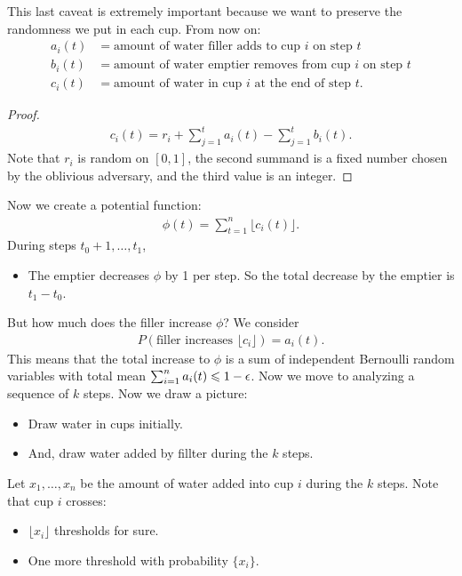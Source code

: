 \documentclass{report}
\begin{document}
This last caveat is extremely important because we want to preserve the randomness we put in each cup. From now on:
\begin{align*}
    a_i(t) &= \text{amount of water filler adds to cup $i$ on step $t$} \\
    b_i(t) &= \text{amount of water emptier removes from cup $i$ on step $t$} \\
    c_i(t) &= \text{amount of water in cup $i$ at the end of step $t$}.
\end{align*}
\begin{proof}
    \begin{align*}
        c_i(t) = r_i + \sum_{j=1}^t a_i(t) - \sum_{j=1}^t b_i(t).
    \end{align*}
    Note that $r_i$ is random on $[0,1]$, the second summand is a fixed number chosen by the oblivious adversary, and the third value is an integer.
\end{proof}
\noindent Now we create a potential function:
\begin{align*}
    \phi(t) = \sum_{t=1}^n \lfloor c_i(t) \rfloor.
\end{align*}
\noindent During steps $t_0+1, \ldots, t_1$, 
\begin{itemize}
    \item The emptier decreases $\phi$ by 1 per step. So the total decrease by the emptier is $t_1 - t_0$.
\end{itemize}
But how much does the filler increase $\phi$? We consider 
\begin{align*}
    P(\text{filler increases $\lfloor c_i\rfloor$}) = a_i(t).
\end{align*}
This means that the total increase to $\phi$ is a sum of independent Bernoulli random variables with total mean $\sum_{i=1}^n a_i(t) \leqslant 1 -\epsilon$. Now we move to analyzing a sequence of $k$ steps. Now we draw a picture:
\begin{itemize}
    \item Draw water in cups initially.
    \item And, draw water added by fillter during the $k$ steps.
\end{itemize}
Let $x_1, \ldots, x_n$ be the amount of water added into cup $i$ during the $k$ steps. Note that cup $i$ crosses:
\begin{itemize}
    \item $\lfloor x_i\rfloor$ thresholds for sure.
    \item One more threshold with probability $\{x_i\}$.
\end{itemize}
\end{document}
